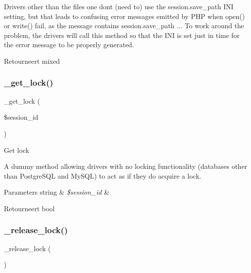 Drivers other than the \textquotesingle{}files\textquotesingle{} one don\textquotesingle{}t (need to) use the session.\+save\+\_\+path I\+NI setting, but that leads to confusing error messages emitted by P\+HP when open() or write() fail, as the message contains session.\+save\+\_\+path ... To work around the problem, the drivers will call this method so that the I\+NI is set just in time for the error message to be properly generated.

\begin{DoxyReturn}{Retourneert}
mixed 
\end{DoxyReturn}
\mbox{\label{class_c_i___session__driver_a2c49c8e23be3e2aca96a9d20de18ffc2}} 
\subsubsection{\texorpdfstring{\_get\_lock()}{\_get\_lock()}}
{\footnotesize\ttfamily \+\_\+get\+\_\+lock (\begin{DoxyParamCaption}\item[{}]{\$session\+\_\+id }\end{DoxyParamCaption})\hspace{0.3cm}{\ttfamily [protected]}}

Get lock

A dummy method allowing drivers with no locking functionality (databases other than Postgre\+S\+QL and My\+S\+QL) to act as if they do acquire a lock.


\begin{DoxyParams}[1]{Parameters}
string & {\em \$session\+\_\+id} & \\
\hline
\end{DoxyParams}
\begin{DoxyReturn}{Retourneert}
bool 
\end{DoxyReturn}
\mbox{\label{class_c_i___session__driver_a0265e356e6cf1eaba229663c1664c37d}} 
\subsubsection{\texorpdfstring{\_release\_lock()}{\_release\_lock()}}
{\footnotesize\ttfamily \+\_\+release\+\_\+lock (\begin{DoxyParamCaption}{ }\end{DoxyParamCaption})\hspace{0.3cm}{\ttfamily [protected]}}

